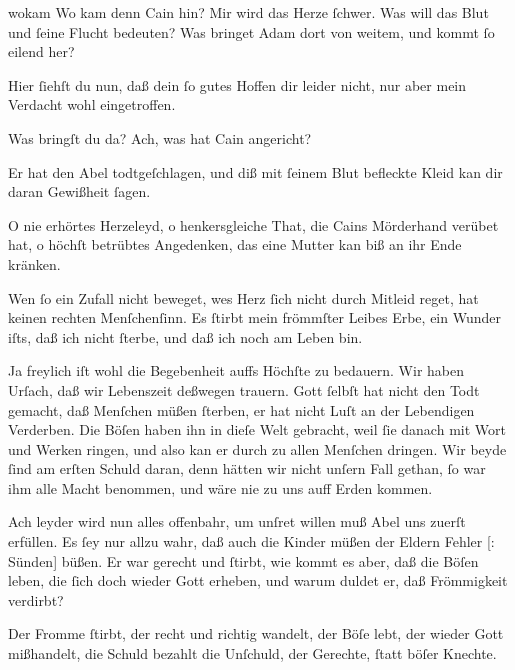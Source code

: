 \documentclass[tocstyle=ref-genre]{ees}
\begin{document}
{\begin{movement}{wokam}
  \voice[Eva]
  Wo kam denn Cain hin? Mir wird das Herze ſchwer.
  Was will das Blut und ſeine Flucht bedeuten?
  Was bringet Adam dort von weitem,
  und kommt ſo eilend her?

  \voice[Adam]
  Hier ſiehſt du nun, daß dein ſo gutes Hoffen
  dir leider nicht,
  nur aber mein Verdacht wohl eingetroffen.

  \voice[Eva]
  Was bringſt du da? Ach, was hat Cain angericht?

  \voice[Adam]
  Er hat den Abel todtgeſchlagen,
  und diß mit ſeinem Blut befleckte Kleid
  kan dir daran Gewißheit ſagen.

  \voice[Eva]
  O nie erhörtes Herzeleyd,
  o henkersgleiche That,
  die Cains Mörderhand verübet hat,
  o höchſt betrübtes Angedenken,
  das eine Mutter kan biß an ihr Ende kränken.
\end{movement}

\begin{movement}{}
  \voice[Eva]
  Wen ſo ein Zufall nicht beweget,
  wes Herz ſich nicht durch Mitleid reget,
  hat keinen rechten Menſchenſinn.
  Es ſtirbt mein frömmſter Leibes Erbe,
  ein Wunder iſts, daß ich nicht ſterbe,
  und daß ich noch am Leben bin.
\end{movement}

\begin{movement}{}
  \voice[Adam]
  Ja freylich iſt wohl die Begebenheit
  auffs Höchſte zu bedauern.
  Wir haben Urſach, daß wir Lebenszeit
  deßwegen trauern.
  Gott ſelbſt hat nicht den Todt gemacht,
  daß Menſchen müßen ſterben,
  er hat nicht Luſt
  an der Lebendigen Verderben.
  Die Böſen haben ihn in dieſe Welt gebracht,
  weil ſie danach mit Wort und Werken ringen,
  und also kan er durch zu allen Menſchen dringen.
  Wir beyde ſind am erſten Schuld daran,
  denn hätten wir nicht unſern Fall gethan,
  ſo war ihm alle Macht benommen,
  und wäre nie zu uns auff Erden kommen.

  \voice[Eva]
  Ach leyder wird nun alles offenbahr,
  um unſret willen
  muß Abel uns zuerſt erfüllen.
  Es ſey nur allzu wahr,
  daß auch die Kinder müßen
  der Eldern Fehler [: Sünden] büßen.
  Er war gerecht und ſtirbt,
  wie kommt es aber, daß die Böſen leben,
  die ſich doch wieder Gott erheben,
  und warum duldet er, daß Frömmigkeit verdirbt?
\end{movement}

\begin{movement}{}
  \voice[Chor]
  Der Fromme ſtirbt, der recht und richtig wandelt,
  der Böſe lebt, der wieder Gott mißhandelt,
  die Schuld bezahlt die Unſchuld, der Gerechte,
  ſtatt böſer Knechte.
\end{movement}

}
\end{document}
